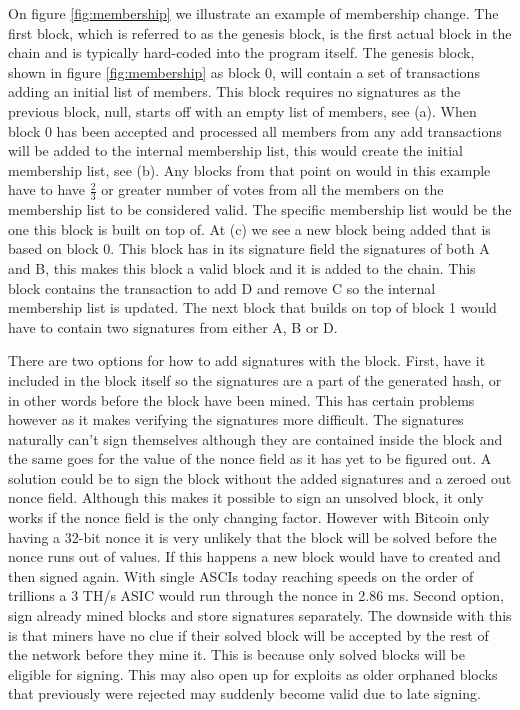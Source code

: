 \documentclass[12pt]{article}
\begin{document}
On figure \ref{fig:membership} we illustrate an example of membership change. The first block, which is referred to as the genesis block, is the first actual block in the chain and is typically hard-coded into the program itself. The genesis block, shown in figure \ref{fig:membership} as block 0, will contain a set of transactions adding an initial list of members. This block requires no signatures as the previous block, null, starts off with an empty list of members, see (a). When block 0 has been accepted and processed all members from any add transactions will be added to the internal membership list, this would create the initial membership list, see (b). Any blocks from that point on would in this example have to have $\frac{2}{3}$ or greater number of votes from all the members on the membership list to be considered valid. The specific membership list would be the one this block is built on top of. At (c) we see a new block being added that is based on block 0. This block has in its signature field the signatures of both A and B, this makes this block a valid block and it is added to the chain. This block contains the transaction to add D and remove C so the internal membership list is updated. The next block that builds on top of block 1 would have to contain two signatures from either A, B or D.


There are two options for how to add signatures with the block. First, have it included in the block itself so the signatures are a part of the generated hash, or in other words before the block have been mined. This has certain problems however as it makes verifying the signatures more difficult. The signatures naturally can't sign themselves although they are contained inside the block and the same goes for the value of the nonce field as it has yet to be figured out. A solution could be to sign the block without the added signatures and a zeroed out nonce field. Although this makes it possible to sign an unsolved block, it only works if the nonce field is the only changing factor. However with Bitcoin only having a 32-bit nonce it is very unlikely that the block will be solved before the nonce runs out of values. If this happens a new block would have to created and then signed again. With single ASCIs today reaching speeds on the order of trillions a 3 TH/s ASIC would run through the nonce in 2.86 ms. Second option, sign already mined blocks and store signatures separately. The downside with this is that miners have no clue if their solved block will be accepted by the rest of the network before they mine it. This is because only solved blocks will be eligible for signing. This may also open up for exploits as older orphaned blocks that previously were rejected may suddenly become valid due to late signing.
\end{document}
